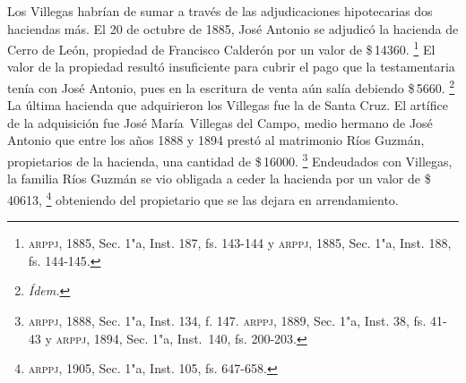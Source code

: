 \documentclass[14pt,twoside,final]{extbook} %
\let\oldfootnote\footnote
\renewcommand\footnote[1]{%
\oldfootnote{\hspace{1mm}#1}}
\begin{document}
Los Villegas habrían de sumar a través de las adjudicaciones hipotecarias dos haciendas más. El 20 de octubre de 1885, José Antonio se adjudicó la hacienda de Cerro de León, propiedad de Francisco Calderón por un valor de \$\,14360.\footnote{\textsc{arppj}, 1885, Sec. 1"a, Inst. 187, fs. 143-144 y \textsc{arppj}, 1885, Sec. 1"a, Inst. 188, fs. 144-145.} El valor de la propiedad resultó insuficiente para cubrir el pago que la testamentaria tenía con José Antonio, pues en la escritura de venta aún salía debiendo \$\,5660.\footnote{\em Ídem.} La última hacienda que adquirieron los Villegas fue la de Santa Cruz. El artífice de la adquisición fue José María~Villegas del Campo, medio hermano de José Antonio que entre los años 1888 y 1894 prestó al matrimonio Ríos Guzmán, propietarios de la hacienda, una cantidad de \$\,16000.\footnote{\textsc{arppj}, 1888, Sec. 1"a, Inst. 134, f. 147. \textsc{arppj}, 1889, Sec. 1"a, Inst. 38, fs. 41-43 y \textsc{arppj}, 1894, Sec. 1"a, Inst.~140, fs. 200-203.} Endeudados con Villegas, la familia Ríos Guzmán se vio obligada a ceder la hacienda por un valor de \$\,40613,\footnote{\textsc{arppj}, 1905, Sec. 1"a, Inst. 105, fs. 647-658.} obteniendo del propietario que se las dejara en arrendamiento.
\end{document}
